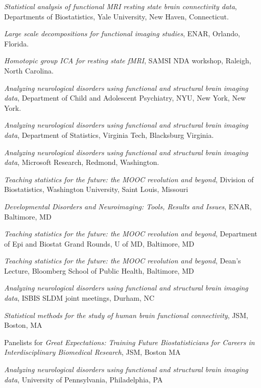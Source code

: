 \documentclass[12pt]{article}
\begin{document}
\begin{description}
\begin{description}
\item {\it Statistical analysis of functional MRI resting state brain connectivity data}, Departments of Biostatistics, Yale University, New Haven, Connecticut.
    \end{description}
\item[\textnormal{2013}]
  \begin{description}
  \item {\it Large scale decompositions for functional imaging studies}, ENAR, Orlando, Florida.
    \item {\it Homotopic group ICA for resting state fMRI}, SAMSI NDA workshop, Raleigh, North Carolina.
    \item {\it Analyzing neurological disorders using functional and structural brain imaging data}, Department of Child and Adolescent Psychiatry, NYU, New York, New York.
    \item {\it Analyzing neurological disorders using functional and structural brain imaging data}, Department of Statistics, Virginia Tech, Blacksburg Virginia.
    \item {\it Analyzing neurological disorders using functional and structural brain imaging data}, Microsoft Research, Redmond, Washington.
  \end{description}
\item[\textnormal{2014}]
    \begin{description}
    \item {\it Teaching statistics for the future: the MOOC revolution and beyond}, Division of Biostatistics, Washington University, Saint Louis, Missouri
    \item {\it Developmental Disorders and Neuroimaging: Tools, Results and Issues}, ENAR, Baltimore, MD
    \item {\it Teaching statistics for the future: the MOOC revolution and beyond}, Department of Epi and Biostat Grand Rounds, U of MD, Baltimore, MD
    \item {\it Teaching statistics for the future: the MOOC revolution and beyond}, Dean's Lecture, Bloomberg School of Public Health, Baltimore, MD
    \item {\it Analyzing neurological disorders using functional and structural brain imaging data}, ISBIS SLDM joint meetings, Durham, NC
    \item {\it Statistical methods for the study of human brain functional connectivity}, JSM, Boston, MA
    \item Panelists for {\it Great Expectations: Training Future Biostatisticians for Careers in Interdisciplinary Biomedical Research}, JSM, Boston MA
	\end{description}
\item[\textnormal{2015}]     
    \begin{description}
	\item {\it Analyzing neurological disorders using functional and structural brain imaging data}, University of Pennsylvania, Philadelphia, PA
	\end{description}
\end{description}
\end{document}
